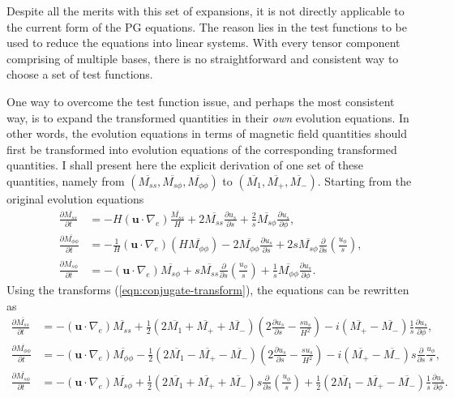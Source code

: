 Despite all the merits with this set of expansions, it is not directly applicable to the current form of the PG equations. 
The reason lies in the test functions to be used to reduce the equations into linear systems.
With every tensor component comprising of multiple bases, there is no straightforward and consistent way to choose a set of test functions.

One way to overcome the test function issue, and perhaps the most consistent way, is to expand the transformed quantities in their \textit{own} evolution equations.
In other words, the evolution equations in terms of magnetic field quantities should first be transformed into evolution equations of the corresponding transformed quantities.
I shall present here the explicit derivation of one set of these quantities, namely from $(\overline{M_{ss}}, \overline{M_{s\phi}}, \overline{M_{\phi\phi}})$ to $(\overline{M_1}, \overline{M_+}, \overline{M_-})$.
Starting from the original evolution equations \parencite{jackson_plesio-geostrophy_2020}
\[\begin{aligned}
    \frac{\partial \overline{M_{ss}}}{\partial t} &= -H (\mathbf{u}\cdot \nabla_e) \frac{\overline{M_{ss}}}{H} + 2 \overline{M_{ss}} \frac{\partial u_s}{\partial s} + \frac{2}{s} \overline{M_{s\phi}} \frac{\partial u_s}{\partial \phi}, \\ 
    \frac{\partial \overline{M_{\phi\phi}}}{\partial t} &= -\frac{1}{H} (\mathbf{u}\cdot \nabla_e) \left(H \overline{M_{\phi\phi}}\right) - 2 \overline{M_{\phi\phi}} \frac{\partial u_s}{\partial s} + 2 s \overline{M_{s\phi}} \frac{\partial}{\partial s}\left(\frac{u_\phi}{s}\right), \\ 
    \frac{\partial \overline{M_{s\phi}}}{\partial t} &= - (\mathbf{u}\cdot \nabla_e) \overline{M_{s\phi}} + s \overline{M_{ss}} \frac{\partial}{\partial s}\left(\frac{u_\phi}{s}\right) + \frac{1}{s} \overline{M_{\phi\phi}} \frac{\partial u_s}{\partial \phi}.
\end{aligned}\]
Using the transforms (\ref{eqn:conjugate-transform}), the equations can be rewritten as
\[\begin{aligned}
    \frac{\partial \overline{M_{ss}}}{\partial t} &= - (\mathbf{u}\cdot \nabla_e) \overline{M_{ss}} + \frac{1}{2}\left(2\overline{M_1} + \overline{M_+} + \overline{M_-}\right) \left(2 \frac{\partial u_s}{\partial s} - \frac{su_s}{H^2}\right) - i \left(\overline{M_+} - \overline{M_-}\right) \frac{1}{s} \frac{\partial u_s}{\partial \phi}, \\ 
    \frac{\partial \overline{M_{\phi\phi}}}{\partial t} &= - (\mathbf{u}\cdot \nabla_e) \overline{M_{\phi\phi}} - \frac{1}{2}\left(2\overline{M_1} - \overline{M_+} - \overline{M_-}\right) \left(2 \frac{\partial u_s}{\partial s} - \frac{su_s}{H^2}\right) - i \left(\overline{M_+} - \overline{M_-}\right) s \frac{\partial}{\partial s} \frac{u_\phi}{s}, \\ 
    \frac{\partial \overline{M_{s\phi}}}{\partial t} &= - (\mathbf{u}\cdot \nabla_e) \overline{M_{s\phi}} + \frac{1}{2}\left(2\overline{M_1} + \overline{M_+} + \overline{M_-}\right) s \frac{\partial}{\partial s}\left(\frac{u_\phi}{s}\right) + \frac{1}{2}\left(2\overline{M_1} - \overline{M_+} - \overline{M_-}\right) \frac{1}{s} \frac{\partial u_s}{\partial \phi}.
\end{aligned}\]
